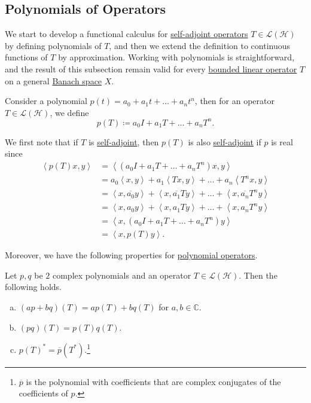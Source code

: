 \subsection{Polynomials of Operators}
We start to develop a functional calculus for \hyperref[def:self-adjoint-op]{self-adjoint operators} \(T\in \mathcal{L} (\mathcal{H} )\) by defining polynomials of \(T\), and then we extend the definition to continuous functions of \(T\) by approximation. Working with polynomials is straightforward, and the result of this subsection remain valid for every \hyperref[def:bounded-linear-op]{bounded linear operator} \(T\) on a general \hyperref[def:Banach-space]{Banach space} \(X\).

\begin{definition}\label{def:polynomial-op}
	Consider a polynomial \(p(t) = a_0 + a_1 t + \ldots  + a_n t^n\), then for an operator \(T\in \mathcal{L} (\mathcal{H} )\), we define
	\[
		p(T) \coloneqq a_0 I + a_1 T + \ldots  + a_n T^n.
	\]
\end{definition}

We first note that if \(T\) is \hyperref[def:self-adjoint-op]{self-adjoint}, then \(p(T)\) is also \hyperref[def:self-adjoint-op]{self-adjoint} if \(p\) is real since
\[
	\begin{split}
		\left\langle p(T) x, y \right\rangle
		&= \left\langle (a_0 I + a_1 T + \ldots  + a_n T^n)x, y \right\rangle \\
		&= a_0 \left\langle x, y \right\rangle + a_1 \left\langle Tx, y \right\rangle + \ldots + a_n \left\langle T^n x, y \right\rangle \\
		&= \left\langle x, \overline{a_0} y \right\rangle + \left\langle x, \overline{a_1}Ty \right\rangle + \ldots + \left\langle x, \overline{a_n}T^n y \right\rangle \\
		&= \left\langle x, a_0 y \right\rangle + \left\langle x, a_1 Ty \right\rangle + \ldots + \left\langle x, a_n T^n y \right\rangle \\
		&= \left\langle x, (a_0 I + a_1 T + \ldots + a_n T^n) y \right\rangle \\
		&= \left\langle x, p(T)y \right\rangle.
	\end{split}
\]

Moreover, we have the following properties for \hyperref[def:polynomial-op]{polynomial operators}.

\begin{proposition}\label{prop:polynomial-op}
	Let \(p, q\) be \(2\) complex polynomials and an operator \(T\in \mathcal{L} (\mathcal{H} )\). Then the following holds.
	\begin{enumerate}[(a)]
		\item \((ap + bq)(T) = ap(T) + bq(T)\) for \(a, b\in \mathbb{C} \).
		\item \((pq)(T) = p(T) q(T)\).
		\item \(p(T)^{\ast} = \overline{p} (T^{\ast} )\).\footnote{\(\overline{p} \) is the polynomial with coefficients that are complex conjugates of the coefficients of \(p\).}
	\end{enumerate}
\end{proposition}

